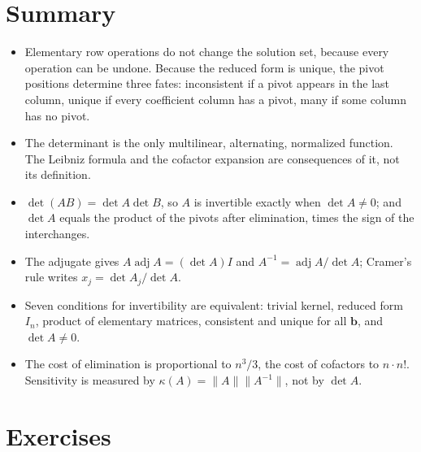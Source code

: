 \section{Summary}

\begin{ringkasan}
\begin{itemize}
  \item Elementary row operations do not change the solution set, because every operation can be
        undone. Because the reduced form is unique, the pivot positions determine three fates:
        inconsistent if a pivot appears in the last column, unique if every coefficient column
        has a pivot, many if some column has no pivot.
  \item The determinant is the only multilinear, alternating, normalized function. The Leibniz
        formula and the cofactor expansion are consequences of it, not its definition.
  \item $\det(AB)=\det A\det B$, so $A$ is invertible exactly when $\det A\neq0$; and $\det A$
        equals the product of the pivots after elimination, times the sign of the interchanges.
  \item The adjugate gives $A\operatorname{adj}A=(\det A)I$ and
        $A^{-1}=\operatorname{adj}A/\det A$; Cramer's rule writes $x_{j}=\det A_{j}/\det A$.
  \item Seven conditions for invertibility are equivalent: trivial kernel, reduced form $I_{n}$,
        product of elementary matrices, consistent and unique for all $\mathbf{b}$, and
        $\det A\neq0$.
  \item The cost of elimination is proportional to $n^{3}/3$, the cost of cofactors to
        $n\cdot n!$. Sensitivity is measured by $\kappa(A)=\lVert A\rVert\lVert A^{-1}\rVert$,
        not by $\det A$.
\end{itemize}
\end{ringkasan}

\section{Exercises}

